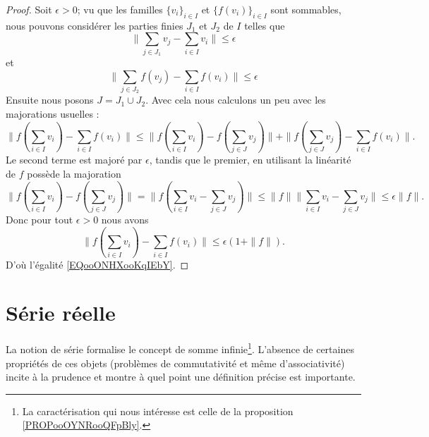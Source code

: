 \begin{proof}
	Soit \( \epsilon>0\); vu que les familles \( \{ v_i \}_{i\in I}\) et \( \{ f(v_i) \}_{i\in I}\) sont sommables, nous pouvons considérer les parties finies \( J_1\) et \( J_2\) de \( I\) telles que
	\begin{equation}
		\big\| \sum_{j\in J_1}v_j-\sum_{i\in I}v_i \big\|\leq \epsilon
	\end{equation}
	et
	\begin{equation}
		\big\| \sum_{j\in J_2}f(v_j)-\sum_{i\in I}f(v_i) \big\|\leq \epsilon
	\end{equation}
	Ensuite nous posons \( J=J_1\cup J_2\). Avec cela nous calculons un peu avec les majorations usuelles :
	\begin{equation}
        \| f(\sum_{i\in I}v_i) -\sum_{i\in I}f(v_i) \|\leq \| f(\sum_{i\in I}v_i)- f(\sum_{j\in J}v_j) \|+  \| f(\sum_{j\in J}v_j)-\sum_{i\in I}f(v_i) \|.
	\end{equation}
	Le second terme est majoré par \( \epsilon\), tandis que le premier, en utilisant la linéarité de \( f\) possède la majoration
	\begin{equation}
		\| f(\sum_{i\in I}v_i)- f(\sum_{j\in J}v_j) \|=\| f(\sum_{i\in I}v_i-\sum_{j\in J}v_j) \|\leq \| f \| \| \sum_{i\in I}v_i- \sum_{j\in J}v_j\|\leq \epsilon\| f \|.
	\end{equation}
	Donc pour tout \( \epsilon>0\) nous avons
	\begin{equation}
		\| f(\sum_{i\in I}v_i) -\sum_{i\in I}f(v_i) \|\leq \epsilon(1+\| f \|).
	\end{equation}
	D'où l'égalité \eqref{EQooONHXooKqIEbY}.
\end{proof}


\section{Série réelle}
\label{secseries}

La notion de série formalise le concept de somme infinie\footnote{La caractérisation qui nous intéresse est celle de la proposition \ref{PROPooOYNRooQFpBly}.}. L'absence de certaines propriétés de ces objets (problèmes de commutativité et même d'associativité) incite à la prudence et montre à quel point une définition précise est importante.


